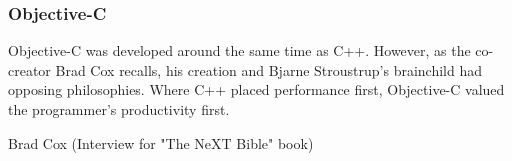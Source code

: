 \par
\vspace{-10pt}
\subsubsection{Objective-C}
Objective-C was developed around the same time as C++. However, as the co-creator Brad Cox recalls, his creation and Bjarne Stroustrup's brainchild had opposing philosophies. Where C++ placed performance first, Objective-C valued the programmer's productivity first.\\
\par
{} {Brad Cox (Interview for "The NeXT Bible" book)}\\
\par


